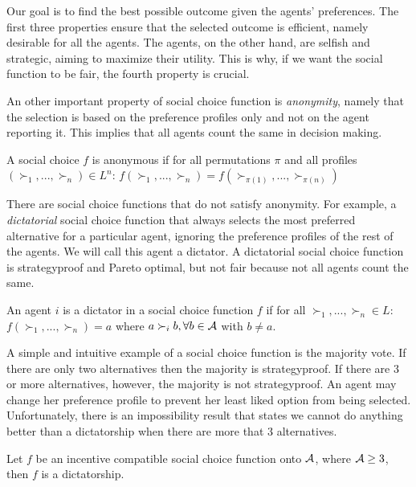 Our goal is to find the best possible outcome given the agents' preferences. The first three properties ensure that the selected outcome is efficient, namely desirable for all the agents. The agents, on the other hand, are selfish and strategic, aiming to maximize their utility. This is why, if we want the social function to be fair, the fourth property is crucial.

An other important property of social choice function is \emph{anonymity}, namely that the selection is based on the preference profiles only and not on the agent reporting it. This implies that all agents count the same in decision making.
\begin{definition}[Anonymous]
A social choice $f$ is anonymous if for all permutations $\pi$ and all profiles $(\succ_1,...,\succ_n)\in L^n$: $f(\succ_1,...,\succ_n) =f(\succ_{\pi(1)},...,\succ_{\pi(n)})$ 
\end{definition}

There are social choice functions that do not satisfy anonymity. For example, a \emph{dictatorial} social choice function that always selects the most preferred alternative for a particular agent, ignoring the preference profiles of the rest of the agents. We will call this agent a dictator. A dictatorial social choice function is strategyproof and Pareto optimal, but not fair because not all agents count the same.


\begin{definition}[Dictator]
An agent $i$ is a dictator in a social choice function $f$ if for all $\succ_1,...,\succ_n\in L$: $f(\succ_1,...,\succ_n)=a$ where $a\succ_i b, \forall b\in \mathcal{A}$ with $b\ne a$.
\end{definition}



A simple and intuitive example of a social choice function is the majority vote. If there are only two alternatives then the majority is strategyproof. If there are $3$ or more alternatives, however, the majority is not strategyproof. An agent may change her preference profile to prevent her least liked option from being selected. Unfortunately, there is an impossibility result that states we cannot do anything better than a dictatorship when there are more that 3 alternatives. 



\begin{theorem}
Let $f$ be an incentive compatible
social choice function onto $\mathcal{A}$, where $\mathcal{A} \ge 3$, then $f$ is a dictatorship.
\end{theorem} 

